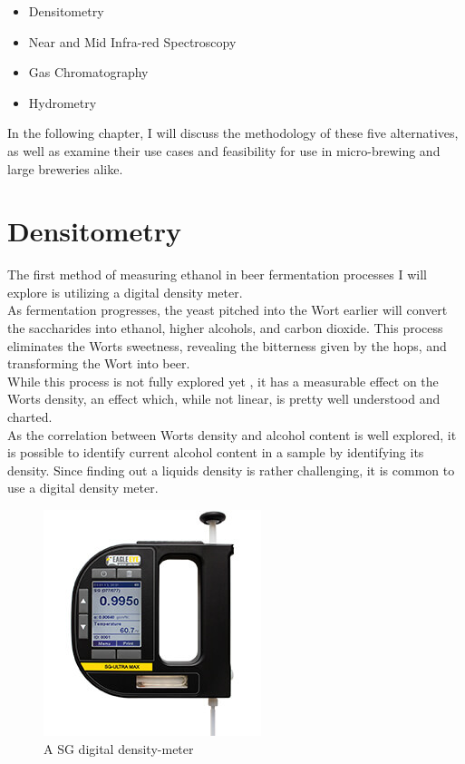 \documentclass[twoside]{ctuthesis}
\theoremstyle{plain}
\theoremstyle{definition}
\theoremstyle{note}
\begin{document}
\begin{itemize}
	\item Densitometry
	\item Near and Mid Infra-red Spectroscopy
	\item Gas Chromatography
	\item Hydrometry
\end{itemize}

In the following chapter, I will discuss the methodology of these five alternatives, as well as examine their use cases and feasibility for use in micro-brewing and large breweries alike.\\

\newpage

\section{Densitometry}
The first method of measuring ethanol in beer fermentation processes I will explore is utilizing a digital density meter.\\
As fermentation progresses, the yeast pitched into the Wort earlier will convert the saccharides into ethanol, higher alcohols, and carbon dioxide. This process eliminates the Worts sweetness, revealing the bitterness given by the hops, and transforming the Wort into beer. \\
While this process is not fully explored yet \cite{Brewing_Science}, it has a measurable effect on the Worts density, an effect which, while not linear, is pretty well understood and charted.\\
As the correlation between Worts density and alcohol content is well explored, it is possible to identify current alcohol content in a sample by identifying its density. Since finding out a liquids density is rather challenging, it is common to use a digital density meter\cite{Ethanol_Measurement}.\\

\begin{figure}[H]
	\centering
	\includegraphics[scale = 0.6]{sg-ultra-max-digital-densitymeter-d}
	\caption{A SG digital density-meter}
\end{figure}
\end{document}

